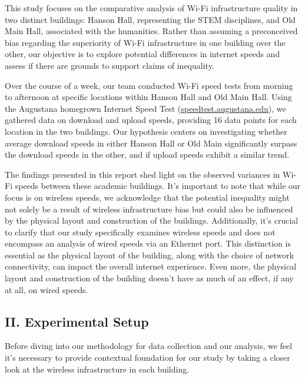 \documentclass[
]{article}
\begin{document}
This study focuses on the comparative analysis of Wi-Fi infrastructure
quality in two distinct buildings: Hanson Hall, representing the STEM
disciplines, and Old Main Hall, associated with the humanities. Rather
than assuming a preconceived bias regarding the superiority of Wi-Fi
infrastructure in one building over the other, our objective is to
explore potential differences in internet speeds and assess if there are
grounds to support claims of inequality.

Over the course of a week, our team conducted Wi-Fi speed tests from
morning to afternoon at specific locations within Hanson Hall and Old
Main Hall. Using the Augustana homegrown Internet Speed Test
(\url{speedtest.augustana.edu}), we gathered data on download and upload
speeds, providing 16 data points for each location in the two buildings.
Our hypothesis centers on investigating whether average download speeds
in either Hanson Hall or Old Main significantly surpass the download
speeds in the other, and if upload speeds exhibit a similar trend.

The findings presented in this report shed light on the observed
variances in Wi-Fi speeds between these academic buildings. It's
important to note that while our focus is on wireless speeds, we
acknowledge that the potential inequality might not solely be a result
of wireless infrastructure bias but could also be influenced by the
physical layout and construction of the buildings. Additionally, it's
crucial to clarify that our study specifically examines wireless speeds
and does not encompass an analysis of wired speeds via an Ethernet port.
This distinction is essential as the physical layout of the building,
along with the choice of network connectivity, can impact the overall
internet experience. Even more, the physical layout and construction of
the building doesn't have as much of an effect, if any at all, on wired
speeds.

\subsection{II. Experimental Setup}\label{ii.-experimental-setup}

Before diving into our methodology for data collection and our analysis,
we feel it's necessary to provide contextual foundation for our study by
taking a closer look at the wireless infrastructure in each building.
\end{document}
